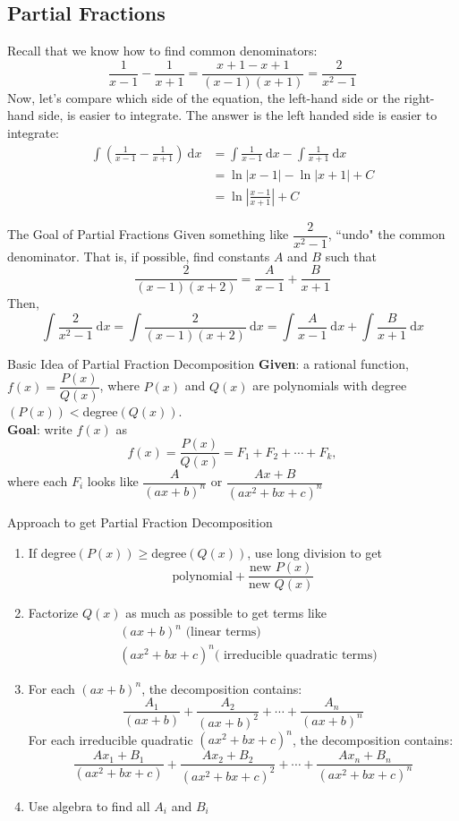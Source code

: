 \documentclass[12pt,a4paper]{article}
\def\d{{\mathrm{d}}}
\begin{document}
\subsection{Partial Fractions}
Recall that we know how to find common denominators: 
$$\frac{1}{x-1}-\frac{1}{x+1}=\frac{x+1-x+1}{(x-1)(x+1)}=\frac{2}{x^2-1}$$
Now, let's compare which side of the equation, the left-hand side or the right-hand side, is easier to integrate. The answer is the left handed side is easier to integrate: 
$$\begin{aligned}
	\int\left(\frac{1}{x-1}-\frac{1}{x+1}\right)\ \d x&=\int\frac{1}{x-1}\ \d x-\int\frac{1}{x+1}\ \d x\\
	&=\ln\left|x-1\right|-\ln\left|x+1\right|+C\\
	&=\ln\left|\frac{x-1}{x+1}\right|+C
\end{aligned}$$
\begin{eg}{The Goal of Partial Fractions}
	Given something like $\dfrac{2}{x^2-1}$, ``undo" the common denominator. That is, if possible, find constants $A$ and $B$ such that
	$$\frac{2}{(x-1)(x+2)}=\frac{A}{x-1}+\frac{B}{x+1}$$
	Then, 
	$$\int\frac{2}{x^2-1}\ \d x = \int\frac{2}{(x-1)(x+2)}\ \d x = \int\frac{A}{x-1}\ \d x+\int\frac{B}{x+1}\ \d x$$
\end{eg}
\begin{thm}{Basic Idea of Partial Fraction Decomposition}
	\textbf{Given}: a rational function, $f(x)=\dfrac{P(x)}{Q(x)}$, where $P(x)$ and $Q(x)$ are polynomials with degree$(P(x))<$degree$(Q(x))$.\\
	\textbf{Goal}: write $f(x)$ as $$f(x)=\frac{P(x)}{Q(x)}=F_1+F_2+\cdots+F_k,$$where each $F_i$ looks like $\dfrac{A}{(ax+b)^n}$ or $\dfrac{Ax+B}{(ax^2+bx+c)^n}$
\end{thm}
\begin{thm}{Approach to get Partial Fraction Decomposition}
	\begin{enumerate}
		\item If degree$(P(x))\geq$degree$(Q(x))$, use long division to get $$\text{polynomial}+\frac{\text{new }P(x)}{\text{new }Q(x)}$$
		\item Factorize $Q(x)$ as much as possible to get terms like \\ $$\begin{aligned}&(ax+b)^n\text{ (linear terms)}\\&(ax^2+bx+c)^n\text{( irreducible quadratic terms)}\end{aligned}$$
		\item For each $(ax+b)^n$, the decomposition contains: $$\frac{A_1}{(ax+b)}+\frac{A_2}{(ax+b)^2}+\cdots+\frac{A_n}{(ax+b)^n}$$For each irreducible quadratic $(ax^2+b x+c)^n$, the decomposition contains: $$\frac{Ax_1+B_1}{(ax^2+bx+c)}+\frac{Ax_2+B_2}{(ax^2+bx+c)^2}+\cdots+\frac{Ax_n+B_n}{(ax^2+bx+c)^n}$$
		\item Use algebra to find all $A_i$ and $B_i$
	\end{enumerate}
\end{thm}
\end{document}
